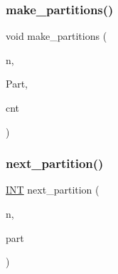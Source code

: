 \subsubsection{\texorpdfstring{make\+\_\+partitions()}{make\_partitions()}}
{\footnotesize\ttfamily void make\+\_\+partitions (\begin{DoxyParamCaption}\item[{\mbox{\hyperlink{galois_8h_a09fddde158a3a20bd2dcadb609de11dc}{I\+NT}}}]{n,  }\item[{\mbox{\hyperlink{galois_8h_a09fddde158a3a20bd2dcadb609de11dc}{I\+NT}} $\ast$}]{Part,  }\item[{\mbox{\hyperlink{galois_8h_a09fddde158a3a20bd2dcadb609de11dc}{I\+NT}}}]{cnt }\end{DoxyParamCaption})}

\mbox{\label{conjugacy__classes__sym__n_8_c_a1cc81054807e5c72ff35f4b82ff48fcb}} 
\subsubsection{\texorpdfstring{next\+\_\+partition()}{next\_partition()}}
{\footnotesize\ttfamily \mbox{\hyperlink{galois_8h_a09fddde158a3a20bd2dcadb609de11dc}{I\+NT}} next\+\_\+partition (\begin{DoxyParamCaption}\item[{\mbox{\hyperlink{galois_8h_a09fddde158a3a20bd2dcadb609de11dc}{I\+NT}}}]{n,  }\item[{\mbox{\hyperlink{galois_8h_a09fddde158a3a20bd2dcadb609de11dc}{I\+NT}} $\ast$}]{part }\end{DoxyParamCaption})}

